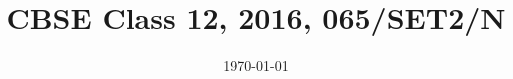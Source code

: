 \documentclass[12pt,-letter paper]{article}
\theoremstyle{remark}
\begin{document}


\vspace{3cm}

	
\title{CBSE Class 12, 2016, 065/SET2/N}
\date{\today}

\maketitle


\bigskip

\renewcommand{\thefigure}{\theenumi}
\renewcommand{\thetable}{\theenumi}
\end{document}

